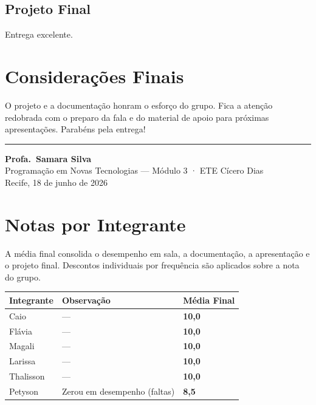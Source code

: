 \documentclass[
  sigconf,
  nonacm, %
  language=portuguese
]{acmart}
\newcommand{\statusok}[1]{{\small\bfseries\color{cgood}#1}}
\begin{document}
\vspace{2pt}
\par
{}

\subsection{Projeto Final}
\noindent\statusok{10,00\,/\,10,00 pts · Completo}

Entrega excelente.

\section{Considerações Finais}

O projeto e a documentação honram o esforço do grupo. Fica a atenção redobrada com o preparo da fala e do material de apoio para próximas apresentações. Parabéns pela entrega!

\vspace{1.5em}
\noindent\rule{\linewidth}{0.4pt}

\begin{flushright}
\textbf{Profa.\ Samara Silva}\\
{\small\color{cmuted} Programação em Novas Tecnologias --- Módulo 3 · ETE Cícero Dias}\\
{\small\color{cmuted} Recife, 18 de junho de 2026}
\end{flushright}

\appendix
\onecolumn
\section{Notas por Integrante}

A média final consolida o desempenho em sala, a documentação, a apresentação e o projeto final. Descontos individuais por frequência são aplicados sobre a nota do grupo.

\vspace{0.5em}
\begin{tabularx}{\linewidth}{@{} X p{3cm} p{2.5cm} @{}}
\toprule
\textbf{Integrante} & \textbf{Observação} & \textbf{Média Final} \\
\midrule
Caio & --- & \textbf{10,0} \\
Flávia & --- & \textbf{10,0} \\
Magali & --- & \textbf{10,0} \\
Larissa & --- & \textbf{10,0} \\
Thalisson & --- & \textbf{10,0} \\
Petyson & Zerou em desempenho (faltas) & \textbf{8,5} \\
\bottomrule
\end{tabularx}
\end{document}
